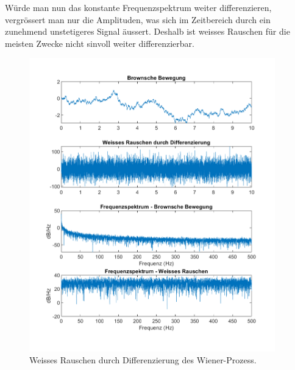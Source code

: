 Würde man nun das konstante Frequenzspektrum weiter differenzieren, vergrössert man nur die Amplituden, was sich im Zeitbereich durch ein zunehmend unstetigeres Signal äussert. Deshalb ist weisses Rauschen für die meisten Zwecke nicht sinvoll weiter differenzierbar.

\begin{figure}
	\centering
	\includegraphics[width=0.95\textwidth]{papers/brown/images/weissesRauscheDurchBrown-timeDomain.png}
	\caption{Weisses Rauschen durch Differenzierung des Wiener-Prozess.}
	\label{brown:diffWienerFFT}
\end{figure}


